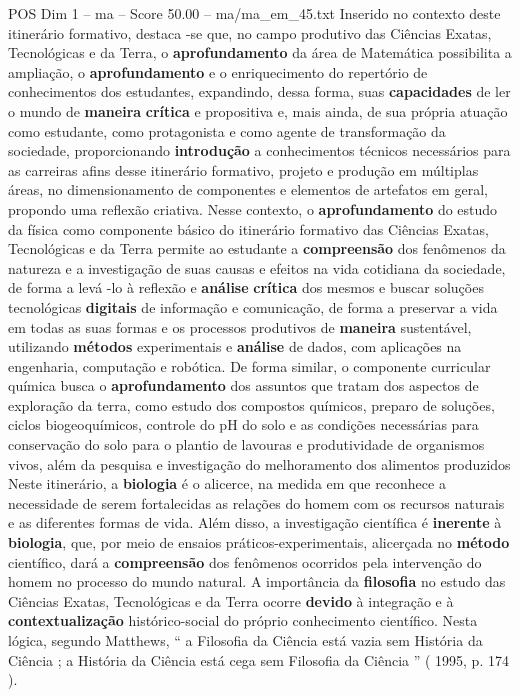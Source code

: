 \begin{textsample}{POS Dim 1 – ma – Score 50.00 – ma/ma\_em\_45.txt}
Inserido no contexto deste itinerário formativo, destaca -se que, no campo produtivo das Ciências Exatas, Tecnológicas e da Terra, o \textbf{aprofundamento} da área de Matemática possibilita a ampliação, o \textbf{aprofundamento} e o enriquecimento do repertório de conhecimentos dos estudantes, expandindo, dessa forma, suas \textbf{capacidades} de ler o mundo de \textbf{maneira} \textbf{crítica} e propositiva e, mais ainda, de sua própria atuação como estudante, como protagonista e como agente de transformação da sociedade, proporcionando \textbf{introdução} a conhecimentos técnicos necessários para as carreiras afins desse itinerário formativo, projeto e produção em múltiplas áreas, no dimensionamento de componentes e elementos de artefatos em geral, propondo uma reflexão criativa.
Nesse contexto, o \textbf{aprofundamento} do estudo da física como componente básico do itinerário formativo das Ciências Exatas, Tecnológicas e da Terra permite ao estudante a \textbf{compreensão} dos fenômenos da natureza e a investigação de suas causas e efeitos na vida cotidiana da sociedade, de forma a levá -lo à reflexão e \textbf{análise} \textbf{crítica} dos mesmos e buscar soluções tecnológicas \textbf{digitais} de informação e comunicação, de forma a preservar a vida em todas as suas formas e os processos produtivos de \textbf{maneira} sustentável, utilizando \textbf{métodos} experimentais e \textbf{análise} de dados, com aplicações na engenharia, computação e robótica.
De forma similar, o componente curricular química busca o \textbf{aprofundamento} dos assuntos que tratam dos aspectos de exploração da terra, como estudo dos compostos químicos, preparo de soluções, ciclos biogeoquímicos, controle do pH do solo e as condições necessárias para conservação do solo para o plantio de lavouras e produtividade de organismos vivos, além da pesquisa e investigação do melhoramento dos alimentos produzidos Neste itinerário, a \textbf{biologia} é o alicerce, na medida em que reconhece a necessidade de serem fortalecidas as relações do homem com os recursos naturais e as diferentes formas de vida.
Além disso, a investigação científica é \textbf{inerente} à \textbf{biologia}, que, por meio de ensaios práticos-experimentais, alicerçada no \textbf{método} científico, dará a \textbf{compreensão} dos fenômenos ocorridos pela intervenção do homem no processo do mundo natural.
A importância da \textbf{filosofia} no estudo das Ciências Exatas, Tecnológicas e da Terra ocorre \textbf{devido} à integração e à \textbf{contextualização} histórico-social do próprio conhecimento científico.
Nesta lógica, segundo Matthews, “ a Filosofia da Ciência está vazia sem História da Ciência ; a História da Ciência está cega sem Filosofia da Ciência ” ( 1995, p. 174 ).

\end{textsample}
